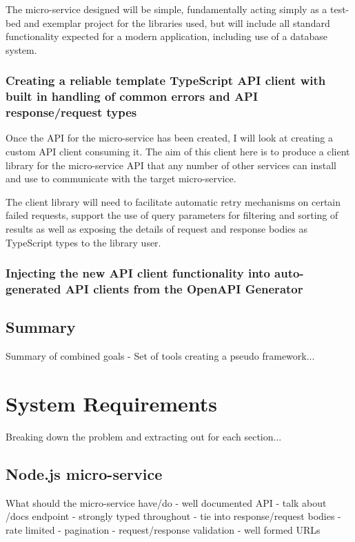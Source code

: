 The micro-service designed will be simple, fundamentally acting simply as a test-bed and exemplar project for the libraries used, but will include all standard functionality expected for a modern application, including use of a database system.

\subsubsection{Creating a reliable template TypeScript API client with built in handling of common errors and API response/request types }
Once the API for the micro-service has been created, I will look at creating a custom API client consuming it. The aim of this client here is to produce a client library for the micro-service API that any number of other services can install and use to communicate with the target micro-service.

The client library will need to facilitate automatic retry mechanisms on certain failed requests, support the use of query parameters for filtering and sorting of results as well as exposing the details of request and response bodies as TypeScript types to the library user.


\subsubsection{Injecting the new API client functionality into auto-generated API clients from the OpenAPI Generator}

\subsection{Summary}
Summary of combined goals - Set of tools creating a pseudo framework...

\section{System Requirements}
Breaking down the problem and extracting out for each section...
\subsection{Node.js micro-service}

What should the micro-service have/do
- well documented API - talk about /docs endpoint
- strongly typed throughout - tie into response/request bodies
- rate limited
- pagination
- request/response validation
- well formed URLs

